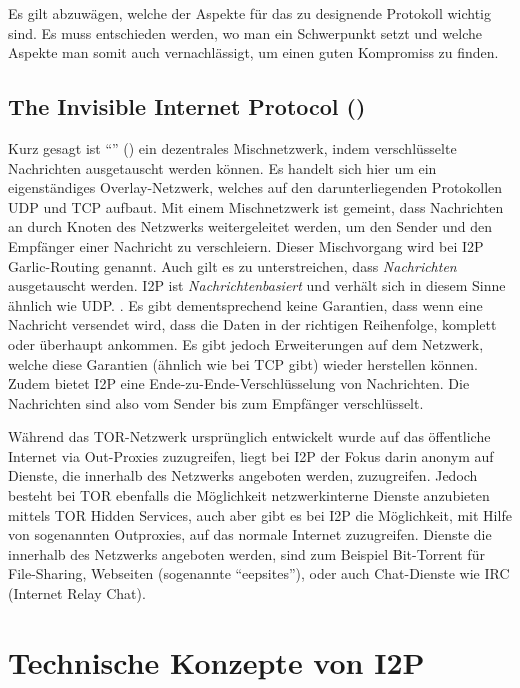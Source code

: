 Es gilt abzuwägen, welche der Aspekte für das zu designende Protokoll wichtig sind.
Es muss entschieden werden, wo man ein Schwerpunkt setzt und welche Aspekte man somit auch vernachlässigt, um einen guten Kompromiss zu finden. \parencites[S.~1-2]{das_anonymity_2018}

\subsection{The Invisible Internet Protocol () }

Kurz gesagt ist ``'' () ein dezentrales Mischnetzwerk, indem verschlüsselte Nachrichten ausgetauscht werden können.
Es handelt sich hier um ein eigenständiges Overlay-Netzwerk, welches auf den darunterliegenden Protokollen UDP und TCP aufbaut.
Mit einem Mischnetzwerk ist gemeint, dass Nachrichten an durch Knoten des Netzwerks weitergeleitet werden, um den Sender und den Empfänger einer Nachricht zu verschleiern. Dieser Mischvorgang wird bei I2P Garlic-Routing genannt.
Auch gilt es zu unterstreichen, dass \textit{Nachrichten} ausgetauscht werden.
I2P ist \textit{Nachrichtenbasiert} und verhält sich in diesem Sinne ähnlich wie UDP. \parencite[S.~1]{zantout_i2p_2011}.
Es gibt dementsprechend keine Garantien, dass wenn eine Nachricht versendet wird, dass die Daten in der richtigen Reihenfolge, komplett oder überhaupt ankommen.
Es gibt jedoch Erweiterungen auf dem Netzwerk, welche diese Garantien (ähnlich wie bei TCP gibt) wieder herstellen können.
Zudem bietet I2P eine Ende-zu-Ende-Verschlüsselung von Nachrichten.
Die Nachrichten sind also vom Sender bis zum Empfänger verschlüsselt.

Während das TOR-Netzwerk ursprünglich entwickelt wurde auf das öffentliche Internet via Out-Proxies zuzugreifen,
liegt bei I2P der Fokus darin anonym auf Dienste, die innerhalb des Netzwerks angeboten werden, zuzugreifen.
Jedoch besteht bei TOR ebenfalls die Möglichkeit netzwerkinterne Dienste anzubieten mittels TOR Hidden Services, auch aber gibt es bei I2P die Möglichkeit, mit Hilfe von sogenannten Outproxies, auf das normale Internet zuzugreifen. \parencite[S. 2]{ehlert_i2p_2011} 
Dienste die innerhalb des Netzwerks angeboten werden, sind zum Beispiel Bit-Torrent für File-Sharing, Webseiten (sogenannte ``eepsites''), oder auch Chat-Dienste wie IRC (Internet Relay Chat).
\parencite[p.~3-4]{de_boer_invisible_2019,noauthor_i2p_nodate}


\section{Technische Konzepte von I2P}
\label{sec:technischeKonzepte}

